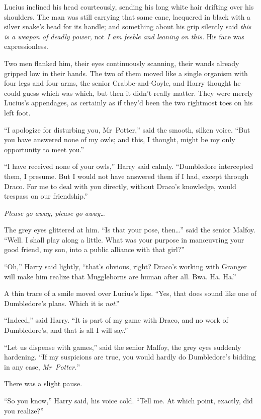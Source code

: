 Lucius inclined his head courteously, sending his long white hair drifting over his shoulders. The man was still carrying that same cane, lacquered in black with a silver snake’s head for its handle; and something about his grip silently said \emph{this is a weapon of deadly power,} not \emph{I am feeble and leaning on this.} His face was expressionless.

Two men flanked him, their eyes continuously scanning, their wands already gripped low in their hands. The two of them moved like a single organism with four legs and four arms, the senior Crabbe-and-Goyle, and Harry thought he could guess which was which, but then it didn’t really matter. They were merely Lucius’s appendages, as certainly as if they’d been the two rightmost toes on his left foot.

“I apologize for disturbing you, Mr~Potter,” said the smooth, silken voice. “But you have answered none of my owls; and this, I thought, might be my only opportunity to meet you.”

“I have received none of your owls,” Harry said calmly. “Dumbledore intercepted them, I presume. But I would not have answered them if I had, except through Draco. For me to deal with you directly, without Draco’s knowledge, would trespass on our friendship.”

\emph{Please go away, please go away…}

The grey eyes glittered at him. “Is that your pose, then…” said the senior Malfoy. “Well. I shall play along a little. What was your purpose in manœuvring your good friend, my son, into a public alliance with that girl?”

“Oh,” Harry said lightly, “that’s obvious, right? Draco’s working with Granger will make him realize that Muggleborns are human after all. Bwa. Ha. Ha.”

A thin trace of a smile moved over Lucius’s lips. “Yes, that does sound like one of Dumbledore’s plans. Which it is \emph{not}.”

“Indeed,” said Harry. “It is part of my game with Draco, and no work of Dumbledore’s, and that is all I will say.”

“Let us dispense with games,” said the senior Malfoy, the grey eyes suddenly hardening. “If my suspicions are true, you would hardly do Dumbledore’s bidding in any case, \emph{Mr~Potter.}”

There was a slight pause.

“So you know,” Harry said, his voice cold. “Tell me. At which point, exactly, did you realize?”


